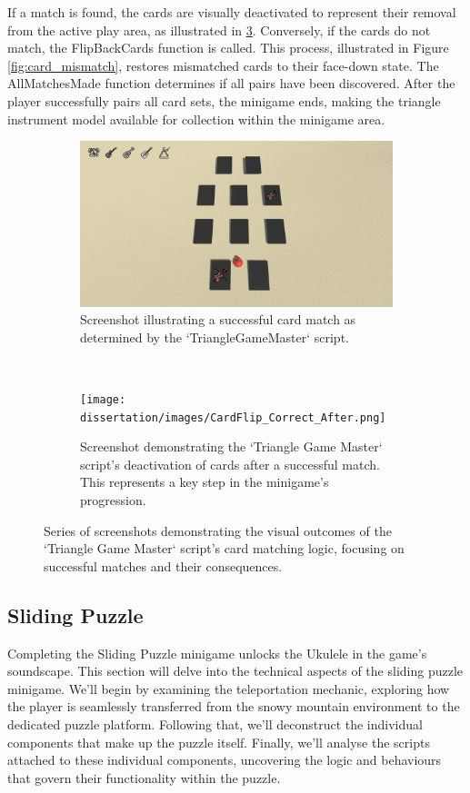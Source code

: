 \documentclass{l4proj}
\begin{document}
If a match is found, the cards are visually deactivated to represent their removal from the active play area, as illustrated in \ref{fig:card_matching_success}. Conversely, if the cards do not match, the FlipBackCards function is called. This process, illustrated in Figure \ref{fig:card_mismatch}, restores mismatched cards to their face-down state. The AllMatchesMade function determines if all pairs have been discovered. After the player successfully pairs all card sets, the minigame ends, making the triangle instrument model available for collection within the minigame area.

\begin{figure}[h]
  \centering
 \begin{subfigure}[t]{0.45\textwidth}
  \includegraphics[width=\textwidth]{dissertation/images/CardFlip_Correct_Mid.png}
  \caption{Screenshot illustrating a successful card match as determined by the `TriangleGameMaster` script.}
  \label{fig:card_match}
 \end{subfigure}
 ~
 \begin{subfigure}[t]{0.45\textwidth}
  \texttt{[image: dissertation/images/CardFlip\_Correct\_After.png]}
  \caption{Screenshot demonstrating the `Triangle Game Master` script's deactivation of cards after a successful match. This represents a key step in the minigame's progression.}
  \label{fig:card_deactivation}
 \end{subfigure}  

 \caption{Series of screenshots demonstrating the visual outcomes of the `Triangle Game Master` script's card matching logic, focusing on successful matches and their consequences.}  

 \label{fig:card_matching_success} 
\end{figure}

\subsection{Sliding Puzzle}
Completing the Sliding Puzzle minigame unlocks the Ukulele in the game's soundscape. This section will delve into the technical aspects of the sliding puzzle minigame. We'll begin by examining the teleportation mechanic, exploring how the player is seamlessly transferred from the snowy mountain environment to the dedicated puzzle platform. Following that, we'll deconstruct the individual components that make up the puzzle itself. Finally, we'll analyse the scripts attached to these individual components, uncovering the logic and behaviours that govern their functionality within the puzzle.
\end{document}
